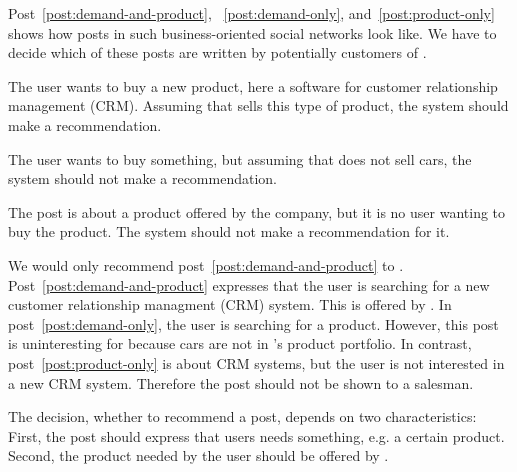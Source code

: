 Post~\ref{post:demand-and-product}, ~\ref{post:demand-only}, and~\ref{post:product-only} shows how posts in such business-oriented social networks look like.
We have to decide which of these posts are written by potentially customers of \acme.

\begin{post}
	\centering
	\caption{The user wants to buy a new product, here a software for customer relationship management (CRM). Assuming that \acme sells this type of product, the system should make a recommendation.}
	\label{post:demand-and-product}
\end{post}

\begin{post}
	\centering
	\caption{The user wants to buy something, but assuming that \acme does not sell cars, the system should not make a recommendation.}
	\label{post:demand-only}
\end{post}

\begin{post}
	\centering
	\caption{The post is about a product offered by the company, but it is no user wanting to buy the product. The system should not make a recommendation for it.}
	\label{post:product-only}
\end{post}

We would only recommend post~\ref{post:demand-and-product} to \acme.
Post~\ref{post:demand-and-product} expresses that the user is searching for a new customer relationship managment (CRM) system.
This is offered by \acme.
In post~\ref{post:demand-only}, the user is searching for a product.
However, this post is uninteresting for \acme because cars are not in \acme's product portfolio.
In contrast, post~\ref{post:product-only} is about CRM systems, but the user is not interested in a new CRM system.
Therefore the post should not be shown to a salesman.

The decision, whether to recommend a post, depends on two characteristics:
First, the post should express that users needs something, e.g. a certain product.
Second, the product needed by the user should be offered by \acme.

